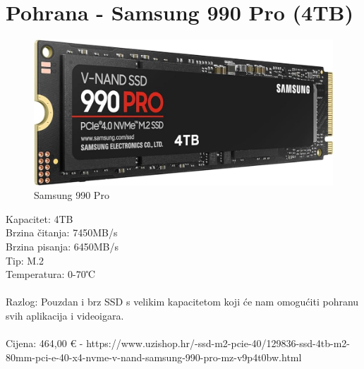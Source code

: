 \documentclass{report}
\begin{document}
\section{Pohrana - Samsung 990 Pro (4TB)}
\begin{figure}[H]
    \centering
    \includegraphics[scale=0.22]{Slike/ssd.jpg}
    \caption{Samsung 990 Pro}
    \label{fig:ssd}
\end{figure}
Kapacitet: 4TB\\Brzina čitanja: 7450MB/s\\Brzina pisanja: 6450MB/s\\Tip: M.2\\Temperatura: 0-70℃\\\\Razlog: Pouzdan i brz SSD s velikim kapacitetom koji će nam omogućiti pohranu svih aplikacija i videoigara.\\\\Cijena: 464,00 € - https://www.uzishop.hr/-ssd-m2-pcie-40/129836-ssd-4tb-m2-80mm-pci-e-40-x4-nvme-v-nand-samsung-990-pro-mz-v9p4t0bw.html

\pagebreak
\end{document}
